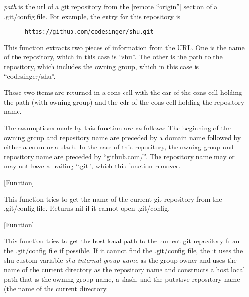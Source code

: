 \begin{doc-string}
\emph{path} is the url of a git repository from the [remote ``origin''] section of a
.git/config file.  For example, the entry for this repository is

\small{\begin{verbatim}
      https://github.com/codesinger/shu.git
\end{verbatim}}

This function extracts two pieces of information from the URL.  One is the name
of the repository, which in this case is ``shu''.  The other is the path to the
repository, which includes the owning group, which in this case is
``codesinger/shu''.

Those two items are returned in a cons cell with the car of the cons cell
holding the path (with owning group) and the cdr of the cons cell holding the
repository name.

The assumptions made by this function are as follows: The beginning of the
owning group and repository name are preceded by a domain name followed by
either a colon or a slash.  In the case of this repository, the owning group and
repository name are preceded by ``github.com/''.  The repository name may or may
not have a trailing ``.git'', which this function removes.
\end{doc-string}

\vspace{1em}
\noindent
{}
\usebox{\funcname}
 \hfill [Function]

\begin{doc-string}
This function tries to get the name of the current git repository
from the .git/config file.  Returns nil if it cannot open .git/config.
\end{doc-string}

\vspace{1em}
\noindent
{}
\usebox{\funcname}
 \hfill [Function]

\begin{doc-string}
This function tries to get the host local path to the current git repository
from the .git/config file if possible.  If it cannot find the .git/config file,
the it uses the shu custom variable \emph{shu-internal-group-name} as the group owner
and uses the name of the current directory as the repository name and constructs
a host local path that is the owning group name, a slash, and the putative
repository name (the name of the current directory.
\end{doc-string}

